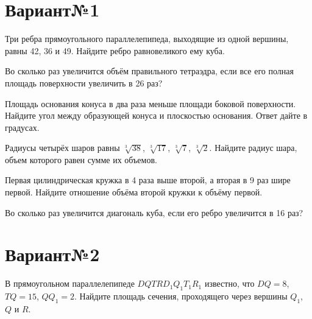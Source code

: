 \documentclass[4apaper]{article}
\begin{document}
\newpage\section*{Вариант№1}

\begin{taskBN}{1}
Три ребра прямоугольного параллелепипеда, выходящие из одной вершины, равны 42, 36 и 49. Найдите ребро равновеликого ему куба.
\end{taskBN}

\begin{taskBN}{2}
Во сколько раз увеличится объём правильного тетраэдра, если все его полная площадь поверхности увеличить в 26 раз?
\end{taskBN}

\begin{taskBN}{3}
Площадь основания конуса в два раза меньше площади боковой поверхности. Найдите угол между образующей конуса и плоскостью основания. Ответ дайте в градусах.
\end{taskBN}

\begin{taskBN}{4}
Радиусы четырёх шаров равны $\sqrt[3]{38}$, $\sqrt[3]{17}$, $\sqrt[3]{7}$, $\sqrt[3]{2}$. Найдите радиус шара, объем которого равен сумме их объемов.
\end{taskBN}

\begin{taskBN}{5}
 Первая цилиндрическая кружка в 4 раза выше второй, а вторая в 9 раз шире первой. Найдите отношение объёма второй кружки к объёму первой.
\end{taskBN}

\begin{taskBN}{6}
Во сколько раз увеличится диагональ куба, если его ребро увеличится в 16 раз?
\end{taskBN}

\newpage\section*{Вариант№2}

\begin{taskBN}{1}
В прямоугольном параллелепипеде  $DQTRD_{1}Q_{1}T_{1}R_{1}$  известно, что  $DQ = 8$, $TQ = 15$, $QQ_{1} = 2$. Найдите площадь сечения, проходящего через вершины $Q_{1}$, $Q$ и $R$.
\end{taskBN}
\end{document}

